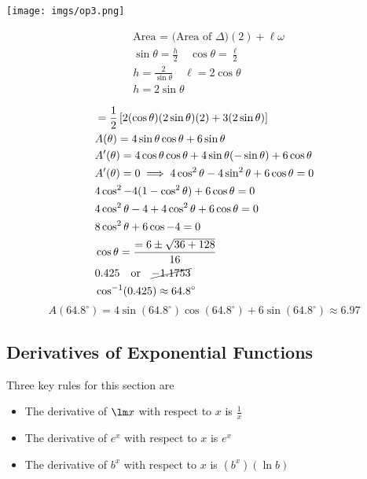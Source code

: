 \documentclass{article}
\begin{document}
\begin{minipage}{0.5\textwidth}
  \centering
  \texttt{[image: imgs/op3.png]}
\end{minipage}%
\begin{minipage}{0.7\textwidth}
    \begin{align*}
        &\text{Area = }\text{(Area of $\Delta$)}(2)+ \ell \omega\\
        &\sin \theta=\frac{h}{2} \quad \cos \theta= \frac{\ell}{2}\\
        &h=\frac{2}{\sin\theta} \quad \boxed{\ell=2\cos\theta}\\
        &\boxed{h=2\sin\theta}
    \end{align*}
\end{minipage}
\begin{align*}
    &=\frac{1}{2}\left[2(\cos\theta)(2\sin\theta)(2)+3(2\sin\theta)\right]\\
    &A(\theta)=4\sin \theta\cos\theta+6\sin\theta\\
    &A'(\theta)=4\cos\theta\cos \theta + 4 \sin \theta(-\sin \theta)+6\cos \theta\\
    &A'(\theta)=0 \implies 4\cos^2 \theta -4\sin^2 \theta +6 \cos \theta=0\\
    &4 \cos^2-4(1-\cos ^2\theta)+6\cos \theta=0\\
    &4\cos^2\theta-4+4\cos^2\theta+6\cos \theta=0\\
    &8\cos^2\theta+6\cos -4=0\\
    &\cos \theta=\frac{=6\pm \sqrt{36+128}}{16}\\
    &0.425 \quad \text{or} \quad \cancel{-1.1753}\\
    &\cos^{-1}(0.425)\approx 64.8^{\circ}\\
\end{align*}
$$A(64.8^{\circ})=4\sin(64.8^{\circ})\cos(64.8^{\circ})+6\sin(64.8^{\circ})\approx6.97$$
\subsection{Derivatives of Exponential Functions}
Three key rules for this section are\\
\begin{itemize}
    \item The derivative of $\lm x$ with respect to $x$ is $\frac{1}{x}$
    \item The derivative of $e^x$ with respect to $x$ is $e^x$
    \item The derivative of $b^x$ with respect to $x$ is $(b^x)(\ln b)$
\end{itemize}
\end{document}
